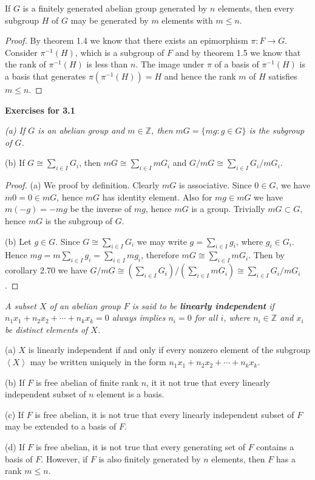\begin{corollary}
If $G$ is a finitely generated abelian group generated by $n$ elements, then every subgroup $H$ of $G$ may be generated by $m$ elements with $m\le n$.
\end{corollary}
\begin{proof}
By theorem 1.4 we know that there exists an epimorphism $\pi:F\to G$. Consider $\pi^{-1}(H)$, which is a subgroup of $F$ and by theorem 1.5 we know that the rank of $\pi^{-1}(H)$ is less than $n$. The image under $\pi$ of a basis of $\pi^{-1}(H)$ is a basis that generates $\pi(\pi^{-1}(H))=H$ and hence the rank $m$ of $H$ satisfies $m\le n$.
\end{proof}
\begin{center}
\begin{large}
    \textbf{Exercises for 3.1}
\end{large}
\end{center}
\begin{problem}\em
(a) If $G$ is an abelian group and $m\in\mathbb{Z}$, then $mG=\{mg:g\in G\}$ is the subgroup of $G$.\par
(b) If $G\cong\sum_{i\in I}G_i$, then $mG\cong\sum_{i\in I}mG_i$ and $G/mG\cong\sum_{i\in I}G_i/mG_i$.
\end{problem}
\begin{proof}
(a) We proof by definition. Clearly $mG$ is associative. Since $0\in G$, we have $m0=0\in mG$, hence $mG$ has identity element. Also for $mg\in mG$ we have $m(-g)=-mg$ be the inverse of $mg$, hence $mG$ is a group. Trivially $mG\subset G$, hence $mG$ is the subgroup of $G$.\par
(b) Let $g\in G$. Since $G\cong\sum_{i\in I}G_i$ we may write $g=\sum_{i\in I}g_i$, where $g_i\in G_i$. Hence $mg=m\sum_{i\in I}g_i=\sum_{i\in I}mg_i$, therefore $mG\cong\sum_{i\in I}mG_i$. Then by corollary 2.70 we have $G/mG\cong\left(\sum_{i\in I}G_i\right)/\left(\sum_{i\in I}mG_i\right)\cong\sum_{i\in I}G_i/mG_i$.
\end{proof}
\begin{problem}\em
A subset $X$ of an abelian group $F$ is said to be \textbf{linearly independent} if $n_1x_1+n_2x_2+\cdots+n_kx_k=0$ always implies $n_i=0$ for all $i$, where $n_i\in\mathbb{Z}$ and $x_i$ be distinct elements of $X$.\par
(a) $X$ is linearly independent if and only if every nonzero element of the subgroup $\left<X\right>$ may be written uniquely in the form $n_1x_1+n_2x_2+\cdots+n_kx_k$.\par
(b) If $F$ is free abelian of finite rank $n$, it it not true that every linearly independent subset of $n$ element is a basis.\par
(c) If $F$ is free abelian, it is not true that every linearly independent subset of $F$ may be extended to a basis of $F$.\par
(d) If $F$ is free abelian, it is not true that every generating set of $F$ contains a basis of $F$. However, if $F$ is also finitely generated by $n$ elements, then $F$ has a rank $m\le n$.
\end{problem}
